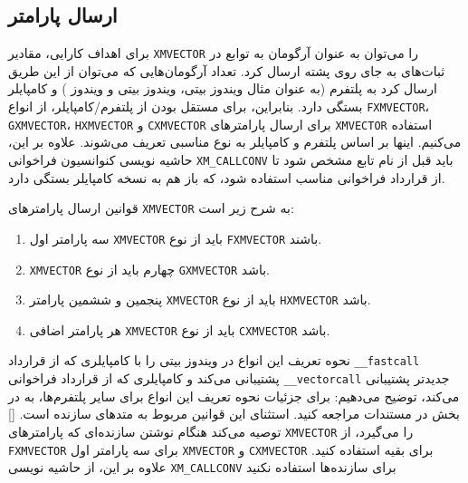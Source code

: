 \subsection{\textbf{ارسال پارامتر}}
\label{subsec:1.6.3}
{
    \Large
    \begin{spacing}{1.5}
        برای اهداف کارایی، مقادیر \texttt{XMVECTOR} را می‌توان به عنوان آرگومان به توابع در ثبات‌های  به جای روی پشته ارسال کرد.
        تعداد آرگومان‌هایی که می‌توان از این طریق ارسال کرد به پلتفرم (به عنوان مثال ویندوز  بیتی، ویندوز  بیتی و ویندوز ) و کامپایلر بستگی دارد.
        بنابراین، برای مستقل بودن از پلتفرم/کامپایلر، از انواع \texttt{FXMVECTOR}، \texttt{GXMVECTOR}، \texttt{HXMVECTOR} و \texttt{CXMVECTOR} برای ارسال پارامترهای \texttt{XMVECTOR} استفاده می‌کنیم.
        اینها بر اساس پلتفرم و کامپایلر به نوع مناسبی تعریف می‌شوند.
        علاوه بر این، حاشیه نویسی کنوانسیون فراخوانی \texttt{XM\_CALLCONV} باید قبل از نام تابع مشخص شود تا از قرارداد فراخوانی مناسب استفاده شود،
        که باز هم به نسخه کامپایلر بستگی دارد.

        قوانین ارسال پارامترهای \texttt{XMVECTOR} به شرح زیر است:
        \begin{enumerate}[label=\textbf{\arabic*}.]
            \item {سه پارامتر اول \texttt{XMVECTOR} باید از نوع \texttt{FXMVECTOR} باشند.}
            \item {\texttt{XMVECTOR} چهارم باید از نوع \texttt{GXMVECTOR} باشد.}
            \item {پنجمین و ششمین پارامتر \texttt{XMVECTOR} باید از نوع \texttt{HXMVECTOR} باشد.}
            \item {هر پارامتر اضافی \texttt{XMVECTOR} باید از نوع \texttt{CXMVECTOR} باشد.}
        \end{enumerate}

        نحوه تعریف این انواع در ویندوز  بیتی را با کامپایلری که از قرارداد \texttt{\_\_fastcall} پشتیبانی می‌کند و
        کامپایلری که از قرارداد فراخوانی \texttt{\_\_vectorcall} جدیدتر پشتیبانی می‌کند، توضیح می‌دهیم:
        \textbf{\vspace{6pt}}
        \lr{}
        \textbf{\vspace{6pt}}
        برای جزئیات نحوه تعریف این انواع برای سایر پلتفرم‌ها، به  در بخش  در مستندات  مراجعه کنید.
        استثنای این قوانین مربوط به متدهای سازنده است. [] توصیه می‌کند هنگام نوشتن سازنده‌ای که پارامترهای \texttt{XMVECTOR} را می‌گیرد،
        از \texttt{FXMVECTOR} برای سه پارامتر اول \texttt{XMVECTOR} و \texttt{CXMVECTOR} برای بقیه استفاده کنید.
        علاوه بر این، از حاشیه نویسی \texttt{XM\_CALLCONV} برای سازنده‌ها استفاده نکنید


\end{spacing}}
